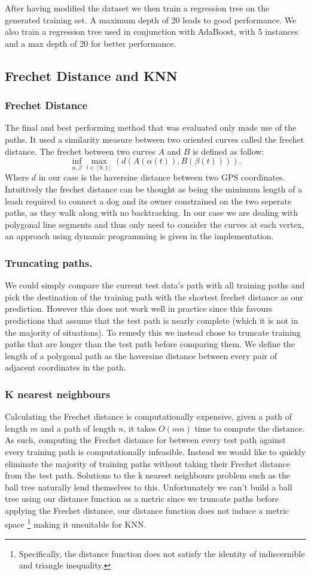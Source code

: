 \documentclass[12pt]{article}
\begin{document}
After having modified the dataset we then train a regression tree on the generated training set. A maximum depth of 20 leads to good performance. We also train a regression tree used in conjunction with AdaBoost, with 5 instances and a max depth of 20 for better performance.

\subsection{Frechet Distance and KNN}
\subsubsection{Frechet Distance}
The final and best performing method that was evaluated only made use of the paths. It used a similarity measure between two oriented curves called the frechet distance. The frechet between two curves $A$ and $B$ is defined as follow:
\[\inf_{\alpha,\beta} \max_{t \in [0,1]} \left( d(A(\alpha(t)), B(\beta(t))) \right).\]
Where $d$ in our case is the haversine distance between two GPS coordinates. Intuitively the frechet distance can be thought as being the minimum length of a leash required to connect a dog and its owner constrained on the two seperate paths, as they walk along with no backtracking. In our case we are dealing with polygonal line segments and thus only need to consider the curves at each vertex, an approach using dynamic programming is given in the implementation.
\subsubsection{Truncating paths.}
We could simply compare the current test data's path with all training paths and pick the destination of the training path with the shortest frechet distance as our prediction. However this does not work well in practice since this favours predictions that assume that the test path is nearly complete (which it is not in the majority of situations). To remedy this we instead chose to truncate training paths that are longer than the test path before comparing them. We define the length of a polygonal path as the haversine distance between every pair of adjacent coordinates in the path.
\subsubsection{K nearest neighbours}
Calculating the Frechet distance is computationally expensive, given a path of length $m$
and a path of length $n$, it takes $O(mn)$ time to compute the distance. As such, computing the Frechet distance for between every test path against every training path is computationally infeasible. Instead we would like to quickly eliminate the majority of training paths without taking their Frechet distance from the test path. Solutions to the k nearest neighbours problem such as the ball tree naturally lend themselves to this. Unfortunately we can't build a ball tree using our distance function as a metric since we truncate paths before applying the Frechet distance, our distance function does not induce a metric space \footnote{Specifically, the distance function does not satisfy the identity of indiscernible and triangle inequality.} making it unsuitable for KNN.
\end{document}
